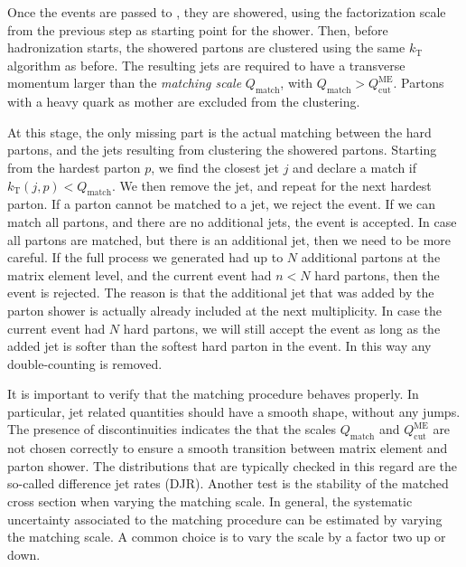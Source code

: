 Once the events are passed to \PYTHIA, they are showered, using the factorization scale from the
previous step as starting point for the shower. Then, before hadronization starts, the showered
partons are clustered using the same $k_{\mathrm{T}}$ algorithm as before. The resulting jets are
required to have a transverse momentum larger than the \textit{matching scale} $Q_{\mathrm{match}}$,
with $Q_{\mathrm{match}} > Q_{\mathrm{cut}}^{\mathrm{ME}}$. 
Partons with a heavy quark as mother are excluded from the clustering. 

At this stage, the only missing part is the actual matching between the hard partons, and the jets
resulting from clustering the showered partons. Starting from the hardest parton $p$, we find the
closest jet $j$ and declare a match if $k_{\mathrm{T}}(j,p) < Q_{\mathrm{match}}$. We then remove
the jet, and repeat for the next hardest parton. If a parton cannot be matched to a jet, we reject
the event. 
If we can match all partons, and there are no additional jets, the event is accepted. 
In case all partons are matched, but there is an additional jet, then we need to be more careful. 
If the full process we generated had up to $N$ additional partons at the matrix element level, and
the current event had $n < N$ hard partons, then the event is rejected. The reason is that
the additional jet that was added by the parton shower is actually already included at the next
multiplicity. In case the current event had $N$ hard partons, we will still accept the event as
long as the added jet is softer than the softest hard parton in the event. 
In this way any double-counting is removed. 

It is important to verify that the matching procedure behaves properly. In particular, jet related
quantities should have a smooth shape, without any jumps. The presence of discontinuities indicates
the that the scales $Q_{\mathrm{match}}$ and $Q_{\mathrm{cut}}^{\mathrm{ME}}$ are not chosen
correctly to ensure a smooth transition between matrix element and parton shower. The distributions
that are typically checked in this regard are the so-called difference jet rates (DJR). 
Another test is the stability of the matched cross section when varying the matching scale. In
general, the systematic uncertainty associated to the matching procedure can be estimated by
varying the matching scale. A common choice is to vary the scale by a factor two up or down. 


